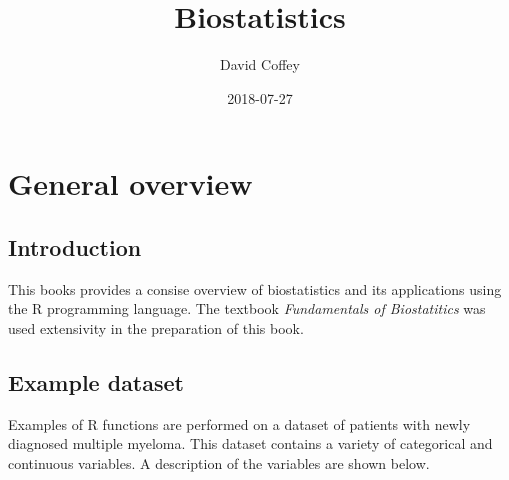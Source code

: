 \documentclass[]{book}
\title{Biostatistics}
\author{David Coffey}
\date{2018-07-27}
\theoremstyle{definition}
\theoremstyle{definition}
\theoremstyle{definition}
\theoremstyle{remark}
\begin{document}
\maketitle

{
\setcounter{tocdepth}{1}
\tableofcontents
}
\chapter{General overview}\label{general-overview}

\section{Introduction}\label{introduction}

This books provides a consise overview of biostatistics and its
applications using the R programming language. The textbook
\emph{Fundamentals of Biostatitics} \citep{Rosner2016} was used
extensivity in the preparation of this book.

\section{Example dataset}\label{example-dataset}

Examples of R functions are performed on a dataset of patients with
newly diagnosed multiple myeloma. This dataset contains a variety of
categorical and continuous variables. A description of the variables are
shown below.
\end{document}
